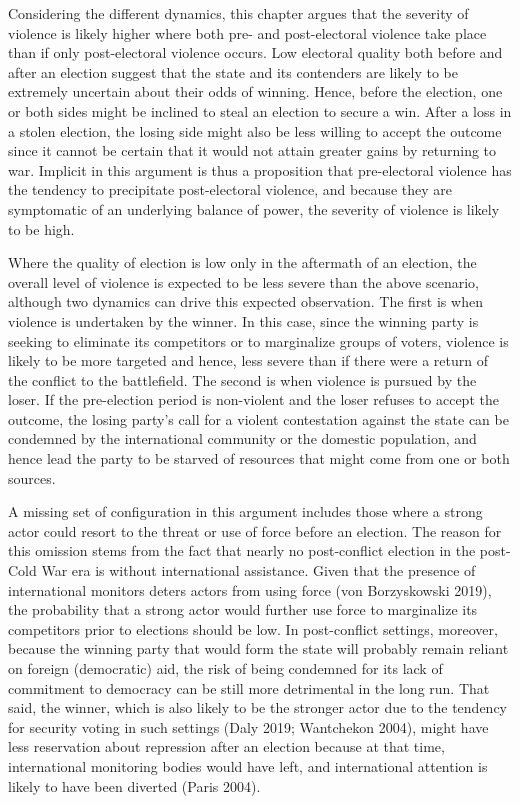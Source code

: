 \documentclass [11pt]{article}
\begin{document}
Considering the different dynamics, this chapter argues that the severity of violence is likely higher where both pre- and post-electoral violence take place than if only post-electoral violence occurs. Low electoral quality both before and after an election suggest that the state and its contenders are likely to be extremely uncertain about their odds of winning. Hence, before the election, one or both sides might be inclined to steal an election to secure a win. After a loss in a stolen election, the losing side might also be less willing to accept the outcome since it cannot be certain that it would not attain greater gains by returning to war. Implicit in this argument is thus a proposition that pre-electoral violence has the tendency to precipitate post-electoral violence, and because they are symptomatic of an underlying balance of power, the severity of violence is likely to be high.

Where the quality of election is low only in the aftermath of an election, the overall level of violence is expected to be less severe than the above scenario, although two dynamics can drive this expected observation. The first is when violence is undertaken by the winner. In this case, since the winning party is seeking to eliminate its competitors or to marginalize groups of voters, violence is likely to be more targeted and hence, less severe than if there were a return of the conflict to the battlefield. The second is when violence is pursued by the loser. If the pre-election period is non-violent and the loser refuses to accept the outcome, the losing party's call for a violent contestation against the state can be condemned by the international community or the domestic population, and hence lead the party to be starved of resources that might come from one or both sources.

A missing set of configuration in this argument includes those where a strong actor could resort to the threat or use of force  before an election. The reason for this omission stems from the fact that nearly no post-conflict election in the post-Cold War era is without international assistance. Given that the presence of international monitors deters actors from using force (von Borzyskowski 2019), the probability that a strong actor would further use force to marginalize its competitors prior to elections should be low. In post-conflict settings, moreover, because the winning party that would form the state will probably remain reliant on foreign (democratic) aid, the risk of being condemned for its lack of commitment to democracy can be still more detrimental in the long run. That said, the winner, which is also likely to be the stronger actor due to the tendency for security voting in such settings (Daly 2019; Wantchekon 2004), might have less reservation about repression after an election because at that time, international monitoring bodies would have left, and international attention is likely to have been diverted (Paris 2004).
\end{document}
